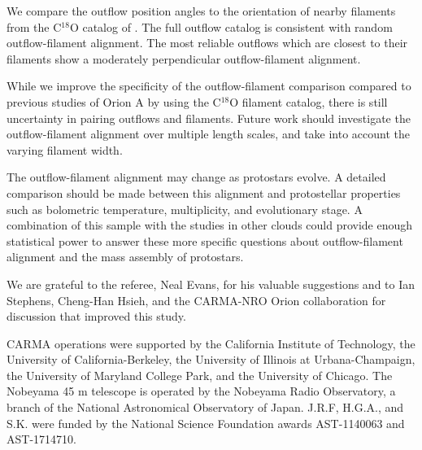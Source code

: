 \documentclass[twocolumn]{aastex63}
\begin{document}
We compare the outflow position angles to the orientation of nearby filaments from the C$^{18}$O catalog of \citet{Suri19}. The full outflow catalog is consistent with random outflow-filament alignment. The most reliable outflows which are closest to their filaments show a moderately perpendicular outflow-filament alignment.


While we improve the specificity of the outflow-filament comparison compared to previous studies of Orion A by using the C$^{18}$O filament catalog, there is still uncertainty in pairing outflows and filaments. Future work should investigate the outflow-filament alignment over multiple length scales, and take into account the varying filament width.

The outflow-filament alignment may change as protostars evolve. A detailed comparison should be made between this alignment and protostellar properties such as bolometric temperature, multiplicity, and evolutionary stage. A combination of this sample with the studies in other clouds could provide enough statistical power to answer these more specific questions about outflow-filament alignment and the mass assembly of protostars.

\acknowledgements
We are grateful to the referee, Neal Evans, for his valuable suggestions and to Ian Stephens, Cheng-Han Hsieh, and the CARMA-NRO Orion collaboration for discussion that improved this study.

 CARMA operations were supported by the California Institute of Technology, the University of California-Berkeley, the University of Illinois at Urbana-Champaign, the University of Maryland College Park, and the University of Chicago. The Nobeyama 45 m telescope is operated by the Nobeyama Radio Observatory, a branch of the National Astronomical Observatory of Japan. J.R.F, H.G.A., and S.K. were funded by the National Science Foundation awards AST-1140063 and AST-1714710.


\clearpage
\startlongtable

\clearpage
\startlongtable

\startlongtable
\clearpage


\clearpage




\end{document}
